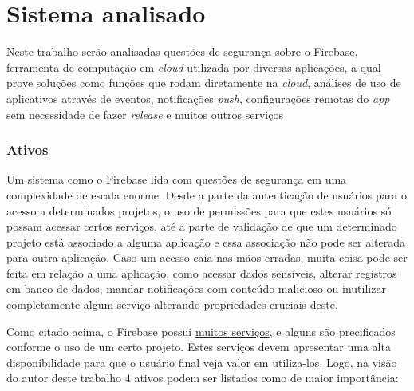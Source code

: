 \documentclass[
    openany,
    12pt,               %
    twoside,            %
    a4paper,            %
    english,            %
    brazil,             %
    ]{abntex2}
\begin{document}
\frenchspacing 

\imprimirfolhaderosto*

\tableofcontents
\cleardoublepage


\textual

\chapter{Sistema analisado}
\label{cap:sistema}

Neste trabalho serão analisadas questões de segurança sobre o Firebase, ferramenta de computação em \textit{cloud} utilizada por diversas aplicações, a qual prove soluções como funções que rodam diretamente na \textit{cloud}, análises de uso de aplicativos através de eventos, notificações \textit{push}, configurações remotas do \textit{app} sem necessidade de fazer \textit{release} e muitos outros serviços

\subsection{Ativos}
\label{cap:ativos}

Um sistema como o Firebase lida com questões de segurança em uma complexidade de escala enorme. Desde a parte da autenticação de usuários para o acesso a determinados projetos, o uso de permissões para que estes usuários só possam acessar certos serviços, até a parte de validação de que um determinado projeto está associado a alguma aplicação e essa associação não pode ser alterada para outra aplicação. Caso um acesso caia nas mãos erradas, muita coisa pode ser feita em relação a uma aplicação, como acessar dados sensíveis, alterar registros em banco de dados, mandar notificações com conteúdo malicioso ou inutilizar completamente algum serviço alterando propriedades cruciais deste. 

Como citado acima, o Firebase possui \href{https://firebase.google.com/products-build}{muitos serviços}, e alguns são precificados conforme o uso de um certo projeto. Estes serviços devem apresentar uma alta disponibilidade para que o usuário final veja valor em utiliza-los. Logo, na visão do autor deste trabalho 4 ativos podem ser listados como de maior importância: 
\end{document}
